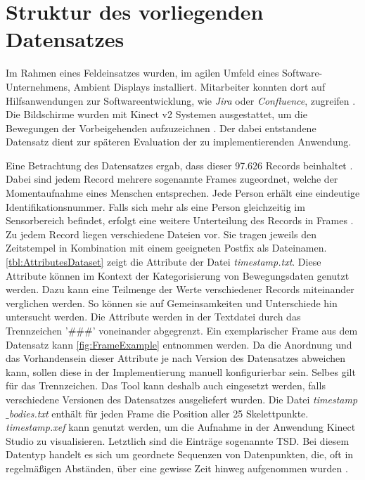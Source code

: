 \section{Struktur des vorliegenden Datensatzes}
\label{2-StrukturDatensatz}
Im Rahmen eines Feldeinsatzes wurden, im agilen Umfeld eines Software-Unternehmens, Ambient Displays installiert.
Mitarbeiter konnten dort auf Hilfsanwendungen zur Softwareentwicklung, wie \emph{Jira} oder \emph{Confluence}, zugreifen \citep{schwarzer_spontaneous_2021}.
Die Bildschirme wurden mit Kinect v2 Systemen ausgestattet,
um die Bewegungen der Vorbeigehenden aufzuzeichnen \citep{schwarzer_spontaneous_2021}.
Der dabei entstandene Datensatz dient zur späteren Evaluation der zu implementierenden Anwendung.

Eine Betrachtung des Datensatzes ergab, dass dieser 97.626 Records beinhaltet \citep{temiz_konzeption_2022}.
Dabei sind jedem Record mehrere sogenannte Frames zugeordnet,
welche der Momentaufnahme eines Menschen entsprechen.
Jede Person erhält eine eindeutige Identifikationsnummer.
Falls sich mehr als eine Person gleichzeitig im Sensorbereich befindet,
erfolgt eine weitere Unterteilung des Records in Frames \citep{temiz_konzeption_2022}.
Zu jedem Record liegen verschiedene Dateien vor.
Sie tragen jeweils den Zeitstempel in Kombination mit einem geeigneten Postfix als Dateinamen.
\autoref{tbl:AttributesDataset} zeigt die Attribute der Datei \emph{timestamp.txt}.
Diese Attribute können im Kontext der Kategorisierung von Bewegungsdaten genutzt werden.
Dazu kann eine Teilmenge der Werte verschiedener Records miteinander verglichen werden.
So können sie auf Gemeinsamkeiten und Unterschiede hin untersucht werden.
Die Attribute werden in der Textdatei durch das Trennzeichen '\#\#\#' voneinander abgegrenzt.
Ein exemplarischer Frame aus dem Datensatz kann \autoref{fig:FrameExample} entnommen werden.
Da die Anordnung und das Vorhandensein dieser Attribute je nach Version des Datensatzes abweichen kann,
sollen diese in der Implementierung manuell konfigurierbar sein.
Selbes gilt für das Trennzeichen.
Das Tool kann deshalb auch eingesetzt werden,
falls verschiedene Versionen des Datensatzes ausgeliefert wurden.
Die Datei \emph{timestamp$\_$bodies.txt} enthält für jeden Frame die Position aller 25 Skelettpunkte.
\emph{timestamp.xef} kann genutzt werden, um die Aufnahme in der Anwendung Kinect Studio zu visualisieren.
Letztlich sind die Einträge sogenannte \ac{TSD}.
Bei diesem Datentyp handelt es sich um geordnete Sequenzen von Datenpunkten,
die, oft in regelmäßigen Abständen, über eine gewisse Zeit hinweg aufgenommen wurden \citep{ali_clustering_2019}.
